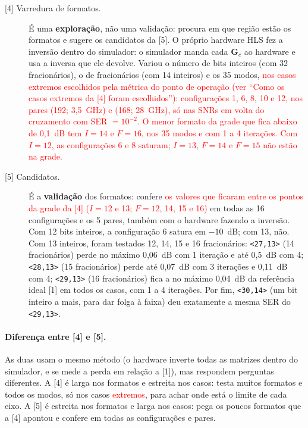 \documentclass[11pt]{article}
\newcommand{\novo}[1]{\textcolor{red}{#1}}
\begin{document}
\begin{description}
  \item[{[4] Varredura de formatos.}] É uma \textbf{exploração}, não uma validação: procura em que
    região estão os formatos e sugere os candidatos da [5].
    O próprio hardware HLS fez a inversão dentro do simulador: o simulador manda cada
    $\mathbf G_c$ ao hardware e usa a inversa que ele devolve. Variou o número de bits inteiros
    (com 32 fracionários), o de fracionários (com 14 inteiros) e os 35 modos, \novo{nos casos
    extremos escolhidos pela métrica do ponto de operação (ver ``Como os casos extremos da [4]
    foram escolhidos''): configurações 1, 6, 8, 10 e 12, nos pares (192; 3,5~GHz) e (168;
    28~GHz), só nas SNRs em volta do cruzamento com SER $= 10^{-2}$. O menor formato da grade
    que fica abaixo de 0,1~dB tem $I = 14$ e $F = 16$, nos 35 modos e com 1 a 4 iterações. Com
    $I = 12$, as configurações 6 e 8 saturam; $I = 13$, $F = 14$ e $F = 15$ não estão na grade.}

  \item[{[5] Candidatos.}] É a \textbf{validação} dos formatos: confere \novo{os valores que ficaram
    entre os pontos da grade da [4] ($I = 12$ e 13; $F = 12$, 14, 15 e 16)} em todas as 16 configurações e
    os 5 pares, também com o hardware fazendo a inversão. Com 12 bits inteiros, a configuração
    6 satura em $-10$~dB; com 13, não. Com 13 inteiros, foram testados 12, 14, 15 e 16
    fracionários: \texttt{<27,13>} (14 fracionários) perde no máximo 0,06~dB com 1 iteração e até
    0,5~dB com 4; \texttt{<28,13>} (15 fracionários) perde até 0,07~dB com 3 iterações e 0,11~dB
    com 4; \texttt{<29,13>} (16 fracionários) fica a no máximo 0,04~dB da referência ideal
    [1] em todos os casos, com 1 a 4 iterações. Por fim, \texttt{<30,14>} (um bit inteiro a mais,
    para dar folga à faixa) deu exatamente a mesma SER do \texttt{<29,13>}.
\end{description}

\paragraph{Diferença entre [4] e [5].} As duas usam o mesmo método (o hardware inverte todas as
matrizes dentro do simulador, e se mede a perda em relação a [1]), mas respondem perguntas
diferentes. A [4] é larga nos formatos e estreita nos casos: testa muitos formatos e todos os
modos, só nos casos \novo{extremos}, para achar onde está o limite de cada eixo. A [5] é
estreita nos formatos e larga nos casos: pega os poucos formatos que a [4] apontou e confere
em todas as configurações e pares.
\end{document}
